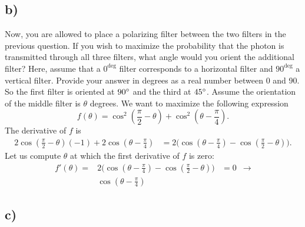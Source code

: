 \documentclass[10pt]{article}
\begin{document}
\subsection*{b)}
\color{blue} Now, you are allowed to place a polarizing filter between the two filters in the previous question. If you wish to maximize the probability that the photon is transmitted through all three filters, what angle would you orient the additional filter? Here, assume that a $0^{\deg}$ filter corresponds to a horizontal filter and $90^{\deg}$ a vertical filter. Provide your answer in degrees as a real number between 0 and 90.
\color{black} So the first filter is oriented at $90\degree$ and the third at $45\degree$. Assume the orientation of the middle filter is $\theta$ degrees. We want to maximize the following expression \[
f(\theta) = \cos^2 (\frac{\pi}{2} - \theta) + \cos^2 (\theta - \frac{\pi}{4}).
\]
The derivative of $f$ is \begin{align*}
2\cos(\frac{\pi}{2} - \theta)(-1) + 2\cos (\theta - \frac{\pi}{4}) &= 2\Big(\cos(\theta - \frac{\pi}{4}) - \cos(\frac{\pi}{2} - \theta)\Big).
\end{align*} 
Let us compute $\theta$ at which the first derivative of $f$ is zero:
\begin{align*}
f'(\theta) =& 2\Big(\cos(\theta - \frac{\pi}{4}) - \cos(\frac{\pi}{2} - \theta)\Big) &= 0 & \longrightarrow \\
              & \cos(\theta - \frac{\pi}{4})
\end{align*}
\subsection*{c)}
\color{blue}
\color{black}
\end{document}

